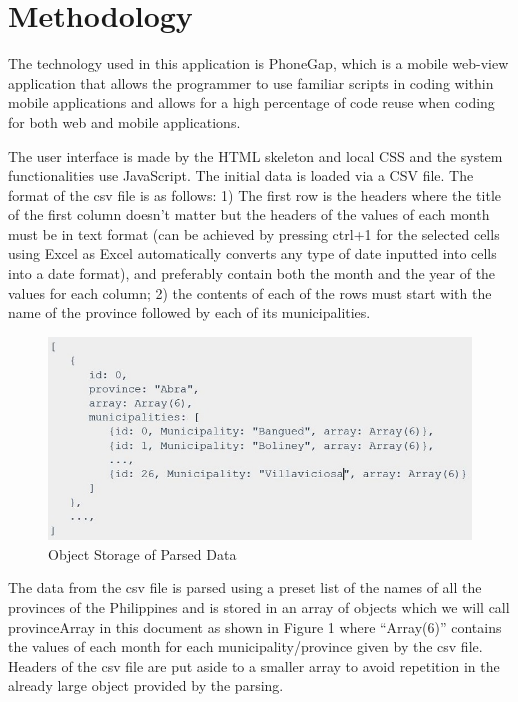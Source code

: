 \documentclass[letterpaper, 10 pt, conference]{ieeeconf}  %
\begin{document}
\section{Methodology}

The technology used in this application is PhoneGap, which is a mobile web-view application that allows the programmer to use familiar scripts in coding within mobile applications and allows for a high percentage of code reuse when coding for both web and mobile applications.\setlength{\parskip}{6pt}

The user interface is made by the HTML skeleton and local CSS and the system functionalities use JavaScript. The initial data is loaded via a CSV file. The format of the csv file is as follows: 1) The first row is the headers where the title of the first column doesn’t matter but the headers of the values of each month must be in text format  (can be achieved by pressing ctrl+1 for the selected cells using Excel as Excel automatically converts any type of date inputted into cells into a date format), and preferably contain both the month and the year of the values for each column; 2) the contents of each of the rows must start with the name of the province followed by each of its municipalities. 

\begin{figure}[h!]
\centering
\includegraphics[scale=.5]{object}
\caption{Object Storage of Parsed Data}
\label{fig:object}
\end{figure}

The data from the csv file is parsed using a preset list of the names of all the provinces of the Philippines and is stored in an array of objects which we will call provinceArray in this document as shown in Figure 1 where “Array(6)” contains the values of each month for each municipality/province given by the csv file. Headers of the csv file are put aside to a smaller array to avoid repetition in the already large object provided by the parsing.\setlength{\parskip}{6pt}
\end{document}
